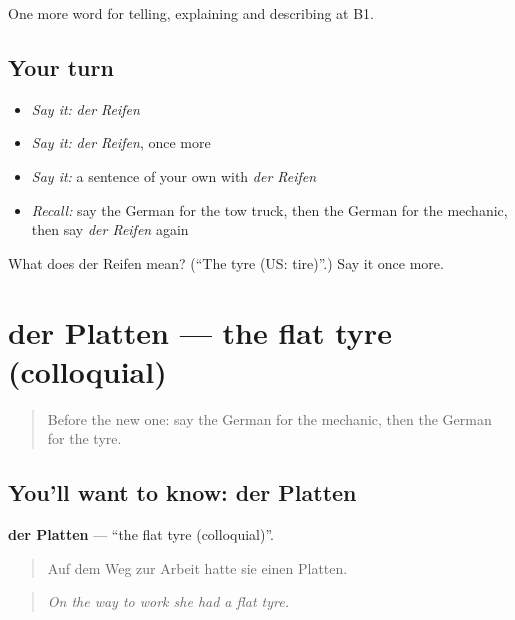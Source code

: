 \begin{grammarlens}[title={What you've built}]
One more word for telling, explaining and describing at B1.
\end{grammarlens}

\subsection*{Your turn}
\begin{itemize}
\raggedright
  \item \emph{Say it:} \emph{der Reifen}
  \item \emph{Say it:} \emph{der Reifen}, once more
  \item \emph{Say it:} a sentence of your own with \emph{der Reifen}
  \item \emph{Recall:} say the German for the tow truck, then the German for the mechanic, then say \emph{der Reifen} again
\end{itemize}

\begin{tcolorbox}[breakable,colback=teal!4,colframe=teal!35!black,title={Before you move on}]
What does der Reifen mean? (\textquotedblleft{}The tyre (US: tire)\textquotedblright{}.) Say it once more.
\end{tcolorbox}
\section[der Platten]{der Platten — the flat tyre (colloquial)}

\label{lesson:GE-C404-platten}



\begin{quote}
Before the new one: say the German for the mechanic, then the German for the tyre.
\end{quote}

\subsection*{You'll want to know: der Platten}
\textbf{der Platten} — \textquotedblleft{}the flat tyre (colloquial)\textquotedblright{}.

\begin{quote}
Auf dem Weg zur Arbeit hatte sie einen Platten.
\end{quote}

\begin{quote}
\emph{On the way to work she had a flat tyre.}
\end{quote}

